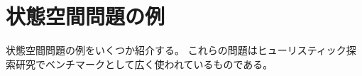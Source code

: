 \section{状態空間問題の例}
\label{sec:search-problem}

状態空間問題の例をいくつか紹介する。
これらの問題はヒューリスティック探索研究でベンチマークとして広く使われているものである。



